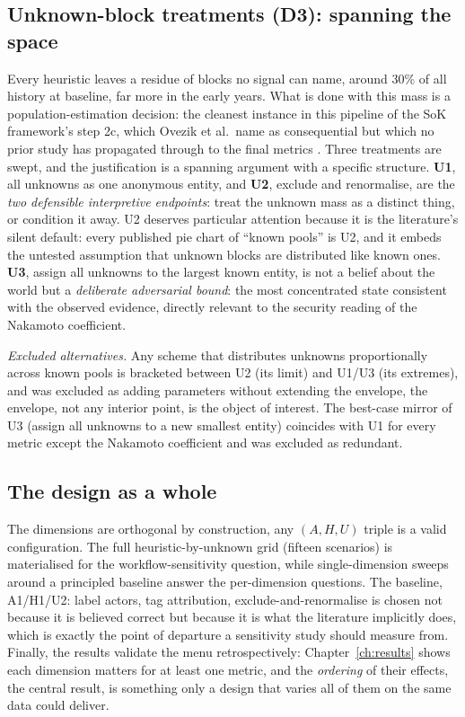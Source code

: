 \documentclass[logo,msc]{infthesis}           %
\begin{document}
\subsection{Unknown-block treatments (D3): spanning the space}
 
Every heuristic leaves a residue of blocks no signal can name, around 30\%
of all history at baseline, far more in the early years. What is done with
this mass is a population-estimation decision: the cleanest instance in this
pipeline of the SoK framework's step 2c, which Ovezik et al.\ name as
consequential but which no prior study has propagated through to the final
metrics \cite{ovezik2025sok}. Three treatments are swept, and the
justification is a spanning argument with a specific structure. \textbf{U1},
all unknowns as one anonymous entity, and \textbf{U2}, exclude and
renormalise, are the \emph{two defensible interpretive endpoints}: treat
the unknown mass as a distinct thing, or condition it away. U2 deserves
particular attention because it is the literature's silent default: every
published pie chart of ``known pools'' is U2, and it embeds the untested
assumption that unknown blocks are distributed like known ones. \textbf{U3},
assign all unknowns to the largest known entity, is not a belief about
the world but a \emph{deliberate adversarial bound}: the most concentrated
state consistent with the observed evidence, directly relevant to the security
reading of the Nakamoto coefficient.
 
\emph{Excluded alternatives.} Any scheme that distributes unknowns
proportionally across known pools is bracketed between U2 (its limit) and
U1/U3 (its extremes), and was excluded as adding parameters without extending
the envelope, the envelope, not any interior point, is the object of
interest. The best-case mirror of U3 (assign all unknowns to a new smallest
entity) coincides with U1 for every metric except the Nakamoto coefficient and
was excluded as redundant.
 
\subsection{The design as a whole}
 
The dimensions are orthogonal by construction, any $(A,H,U)$ triple is a
valid configuration. The full heuristic-by-unknown grid (fifteen scenarios) is
materialised for the workflow-sensitivity question, while single-dimension
sweeps around a principled baseline answer the per-dimension questions. The
baseline, A1/H1/U2: label actors, tag attribution, exclude-and-renormalise
is chosen not because it is believed correct but because it is what the
literature implicitly does, which is exactly the point of departure a
sensitivity study should measure from. Finally, the results validate the menu
retrospectively: Chapter~\ref{ch:results} shows each dimension matters for at
least one metric, and the \emph{ordering} of their effects, the central
result, is something only a design that varies all of them on the same data
could deliver.
 
\end{document}
